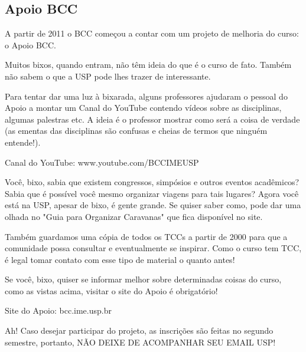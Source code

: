 \subsection{Apoio BCC}

A partir de 2011 o BCC começou a contar com um projeto de melhoria do curso: o Apoio BCC.

Muitos bixos, quando entram, não têm ideia do que é o curso de fato. Também não sabem o que a USP pode lhes trazer de interessante.

Para tentar dar uma luz à bixarada, alguns professores ajudaram o pessoal do Apoio a montar um Canal do YouTube contendo vídeos sobre as disciplinas, algumas palestras etc. A ideia é o professor mostrar como será a coisa de verdade (as ementas das disciplinas são confusas e cheias de termos que ninguém entende!).

Canal do YouTube: www.youtube.com/BCCIMEUSP

Você, bixo, sabia que existem congressos, simpósios e outros eventos acadêmicos? Sabia que é possível você mesmo organizar viagens para tais lugares? Agora você está na USP, apesar de bixo, é gente grande. Se quiser saber como, pode dar uma olhada no "Guia para Organizar Caravanas" que fica disponível no site.

Também guardamos uma cópia de todos os TCCs a partir de 2000 para que a comunidade possa consultar e eventualmente se inspirar. Como o curso tem TCC, é legal tomar contato com esse tipo de material o quanto antes!

Se você, bixo, quiser se informar melhor sobre determinadas coisas do curso, como as vistas acima, visitar o site do Apoio é obrigatório!

Site do Apoio: bcc.ime.usp.br

Ah! Caso desejar participar do projeto, as inscrições são feitas no segundo semestre, portanto, NÃO DEIXE DE ACOMPANHAR SEU EMAIL USP!
